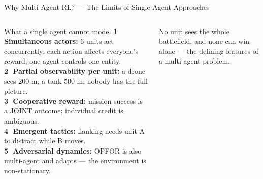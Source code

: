 \documentclass[aspectratio=169,10pt,t]{beamer}
\begin{document}

\begin{frame}{Why Multi-Agent RL? --- The Limits of Single-Agent Approaches}
\begin{columns}[T]
\begin{cbox}[ISSAred]{What a single agent cannot model}\scriptsize
\textbf{\textcircled{\tiny1} Simultaneous actors:} 6 units act concurrently; each action affects everyone's reward; one agent controls one entity.\\
\textbf{\textcircled{\tiny2} Partial observability per unit:} a drone sees 200 m, a tank 500 m; nobody has the full picture.\\
\textbf{\textcircled{\tiny3} Cooperative reward:} mission success is a JOINT outcome; individual credit is ambiguous.\\
\textbf{\textcircled{\tiny4} Emergent tactics:} flanking needs unit A to distract while B moves.\\
\textbf{\textcircled{\tiny5} Adversarial dynamics:} OPFOR is also multi-agent and adapts --- the environment is non-stationary.\end{cbox}
\begin{ibox}\scriptsize No unit sees the whole battlefield, and none can win alone --- the defining features of a multi-agent problem.\end{ibox}
\end{columns}
\end{frame}
\end{document}
